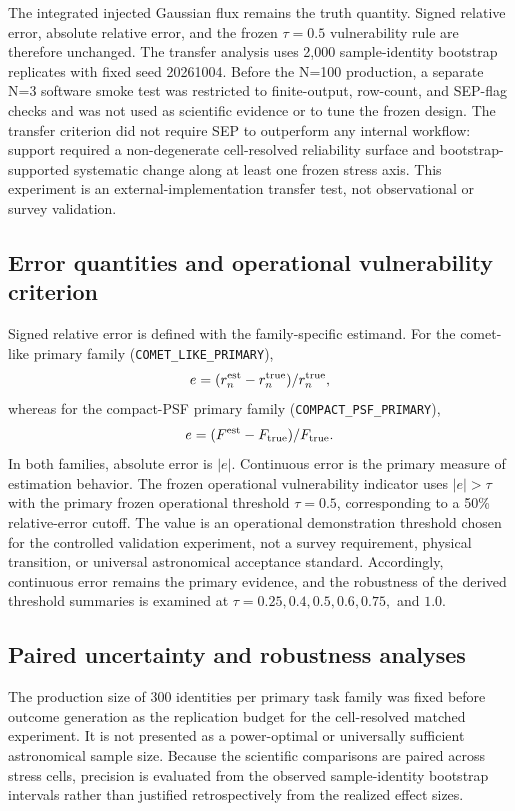 The integrated injected Gaussian flux remains the truth quantity.
Signed relative error, absolute relative error, and the frozen
\(\tau=0.5\) vulnerability rule are therefore unchanged. The transfer
analysis uses 2,000 sample-identity bootstrap replicates with fixed seed
20261004. Before the N=100 production, a separate N=3 software smoke test
was restricted to finite-output, row-count, and SEP-flag checks and was
not used as scientific evidence or to tune the frozen design. The
transfer criterion did not require SEP to outperform any internal
workflow: support required a non-degenerate cell-resolved reliability
surface and bootstrap-supported systematic change along at least one
frozen stress axis. This experiment is an external-implementation
transfer test, not observational or survey validation.

\subsection{Error quantities and operational vulnerability
criterion}\label{error-quantities-and-operational-vulnerability-criterion}

Signed relative error is defined with the family-specific estimand. For
the comet-like primary family (\texttt{COMET\_LIKE\_PRIMARY}),
\[
e=(r_n^{\rm est}-r_n^{\rm true})/r_n^{\rm true},
\]
whereas for the compact-PSF primary family
(\texttt{COMPACT\_PSF\_PRIMARY}),
\[
e=(F^{\rm est}-F_{\rm true})/F_{\rm true}.
\]
In both families, absolute error is \(|e|\). Continuous error is the
primary measure of estimation behavior. The frozen operational vulnerability indicator
uses \(|e|>\tau\) with the primary frozen operational threshold
\(\tau=0.5\), corresponding to a 50\% relative-error cutoff. The value
is an operational demonstration threshold chosen for the controlled
validation experiment, not a survey requirement, physical transition,
or universal astronomical acceptance standard. Accordingly, continuous
error remains the primary evidence, and the robustness of the derived
threshold summaries is examined at
\(\tau=0.25,0.4,0.5,0.6,0.75,\) and \(1.0\).

\subsection{Paired uncertainty and robustness
analyses}\label{paired-uncertainty-and-robustness-analyses}

The production size of 300 identities per primary task family was fixed
before outcome generation as the replication budget for the cell-resolved
matched experiment. It is not presented as a power-optimal or universally
sufficient astronomical sample size. Because the scientific comparisons
are paired across stress cells, precision is evaluated from the observed
sample-identity bootstrap intervals rather than justified retrospectively
from the realized effect sizes.

